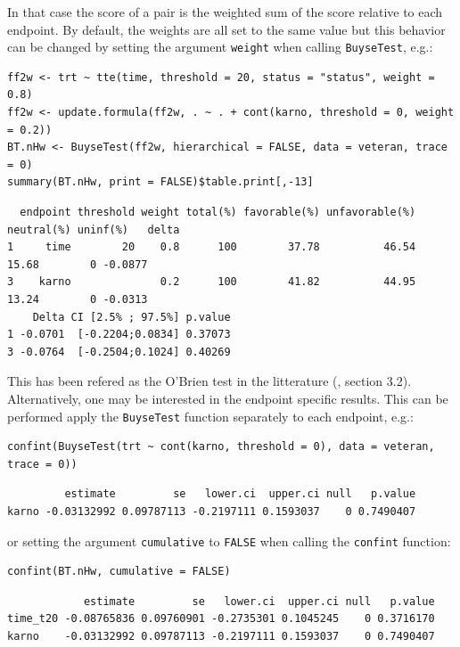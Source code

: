 \documentclass[12pt]{article}
\begin{document}
In that case the score of a pair is the weighted sum of the score
relative to each endpoint. By default, the weights are all set to the
same value but this behavior can be changed by setting the argument
\texttt{weight} when calling \texttt{BuyseTest}, e.g.:
\lstset{language=r,label= ,caption= ,captionpos=b,numbers=none}
\begin{lstlisting}
ff2w <- trt ~ tte(time, threshold = 20, status = "status", weight = 0.8)
ff2w <- update.formula(ff2w, . ~ . + cont(karno, threshold = 0, weight = 0.2))
BT.nHw <- BuyseTest(ff2w, hierarchical = FALSE, data = veteran, trace = 0)
summary(BT.nHw, print = FALSE)$table.print[,-13]
\end{lstlisting}

\begin{verbatim}
  endpoint threshold weight total(%) favorable(%) unfavorable(%) neutral(%) uninf(%)   delta
1     time        20    0.8      100        37.78          46.54      15.68        0 -0.0877
3    karno              0.2      100        41.82          44.95      13.24        0 -0.0313
    Delta CI [2.5% ; 97.5%] p.value
1 -0.0701  [-0.2204;0.0834] 0.37073
3 -0.0764  [-0.2504;0.1024] 0.40269
\end{verbatim}


This has been refered as the O’Brien test in the litterature
(\cite{verbeeck2019generalized}, section 3.2). Alternatively, one may be
interested in the endpoint specific results. This can be performed
apply the \texttt{BuyseTest} function separately to each endpoint, e.g.:
\lstset{language=r,label= ,caption= ,captionpos=b,numbers=none}
\begin{lstlisting}
confint(BuyseTest(trt ~ cont(karno, threshold = 0), data = veteran, trace = 0))
\end{lstlisting}

\begin{verbatim}
         estimate         se   lower.ci  upper.ci null   p.value
karno -0.03132992 0.09787113 -0.2197111 0.1593037    0 0.7490407
\end{verbatim}


or setting the argument \texttt{cumulative} to \texttt{FALSE} when calling the
\texttt{confint} function:
\lstset{language=r,label= ,caption= ,captionpos=b,numbers=none}
\begin{lstlisting}
confint(BT.nHw, cumulative = FALSE)
\end{lstlisting}

\begin{verbatim}
            estimate         se   lower.ci  upper.ci null   p.value
time_t20 -0.08765836 0.09760901 -0.2735301 0.1045245    0 0.3716170
karno    -0.03132992 0.09787113 -0.2197111 0.1593037    0 0.7490407
\end{verbatim}
\end{document}
